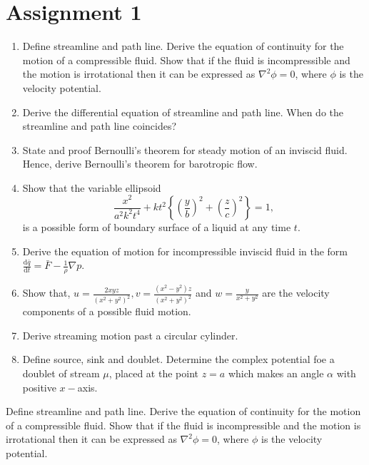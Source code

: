 \documentclass[12pt]{article}
\begin{document}
\section{Assignment 1}
\begin{enumerate}
    \item Define streamline and path line. Derive the equation of continuity for the motion of a compressible fluid. Show that if the fluid is incompressible and the motion is irrotational then it can be expressed as $ \nabla^2 \phi=0 $, where $ \phi $ is the velocity potential.
    \item Derive the differential equation of streamline and path line. When do the streamline and path line coincides?
    \item State and proof Bernoulli's theorem for steady motion of an inviscid fluid. Hence, derive Bernoulli's theorem for barotropic flow. 
    \item Show that the variable ellipsoid 
    \[
        \frac{x^2}{a^2k^2t^4}+kt^2\left\{ \left( \frac{y}{b} \right)^2+\left( \frac{z}{c} \right)^2 \right\}=1,
    \]
    is a possible form of boundary surface of a liquid at any time $ t $.
    \item Derive the equation of motion for incompressible inviscid fluid in the form $ \frac{\mathrm{d}\bar{q}}{\mathrm{d}t}=\bar{F}-\frac{1}{\rho}\nabla p $.
    \item Show that, $ u=\frac{2xyz}{\left( x^2+y^2 \right)^2}, v=\frac{\left( x^2-y^2  \right)z}{\left( x^2+y^2 \right)^2} $ and $ w=\frac{y}{x^2+y^2} $ are the velocity components of a possible fluid motion.
    \item Derive streaming motion past a circular cylinder.
    \item Define source, sink and doublet. Determine the complex potential foe a doublet of stream $ \mu $, placed at the point $ z=a $ which makes an angle $ \alpha $ with positive $ x- $axis.
\end{enumerate}
\newpage
\begin{prob}
    Define streamline and path line. Derive the equation of continuity for the motion of a compressible fluid. Show that if the fluid is incompressible and the motion is irrotational then it can be expressed as $ \nabla^2 \phi=0 $, where $ \phi $ is the velocity potential.
\end{prob}
\end{document}
